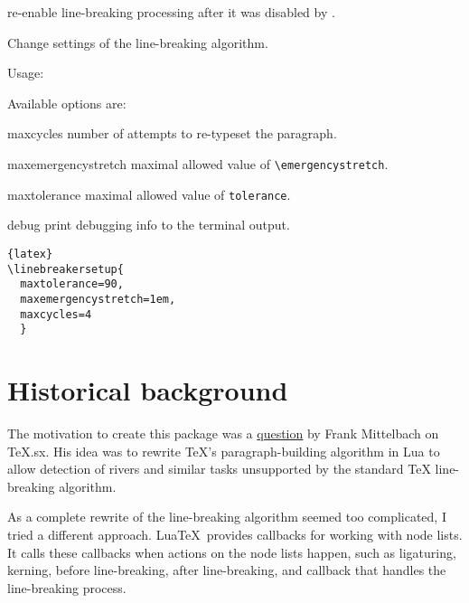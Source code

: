 \documentclass{l3doc}
\begin{document}
\begin{function}{\linebreakerenable}
re-enable line-breaking processing after it was disabled by \cmd{\linebreakerdisable}.
\end{function}

\begin{function}{\linebreakersetup}
  Change settings of the line-breaking algorithm.
  

  \noindent Usage: \cmd{\linebreakersetup}

  \noindent Available options are:
\end{function}

\begin{function}{maxcycles}
number of attempts to re-typeset the paragraph.
\end{function}

\begin{function}{maxemergencystretch}
maximal allowed value of \verb|\emergencystretch|.
\end{function}

\begin{function}{maxtolerance}
maximal allowed value of \verb|tolerance|.
\end{function}

\begin{function}{debug}
print debugging info to the terminal output.
\end{function}


\begin{lstlisting}{latex}
\linebreakersetup{
  maxtolerance=90,
  maxemergencystretch=1em,
  maxcycles=4
  }
\end{lstlisting}



\section{Historical background}

The motivation to create this package was a 
\href{http://tex.stackexchange.com/q/200989/2891}{question} by Frank Mittelbach on
TeX.sx. His idea was to rewrite TeX’s paragraph-building algorithm in Lua to
allow detection of rivers and similar tasks unsupported by the standard TeX
line-breaking algorithm.

As a complete rewrite of the line-breaking algorithm seemed too complicated, 
I tried a different approach. Lua\TeX\ provides  callbacks for working with node lists. 
It calls these callbacks when actions on the node lists happen, such as 
ligaturing, kerning, before line-breaking, after line-breaking, and 
callback that  handles the line-breaking process. 
\end{document}
